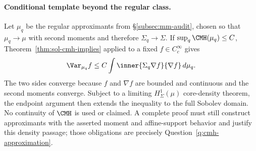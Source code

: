 \documentclass[../main.tex]{subfiles}
\begin{document}
\paragraph{Conditional template beyond the regular class.}
Let $\mu_q$ be the regular approximants from \S\ref{subsec:mm-audit}, chosen so that
$\mu_q\to\mu$ with second moments and therefore $\Sigma_q\to\Sigma$.  If
$\sup_q\CMH(\mu_q)\le C$, Theorem~\ref{thm:sol-cmh-implies} applied to a fixed
$f\in C_c^\infty$ gives
\[
  \Var_{\mu_q}f\le C\int\inner{\Sigma_q\nabla f}{\nabla f}\,d\mu_q.
\]
The two sides converge because $f$ and $\nabla f$ are bounded and continuous and the second
moments converge. Subject to a limiting $H^1_\Sigma(\mu)$ core-density theorem, the endpoint
argument then extends the inequality to the full Sobolev domain. No continuity of $\CMH$ is used
or claimed. A complete proof must still construct approximants with the asserted moment and
affine-support behavior and justify this density passage; those obligations are precisely
Question~\ref{q:cmh-approximation}.
\end{document}
